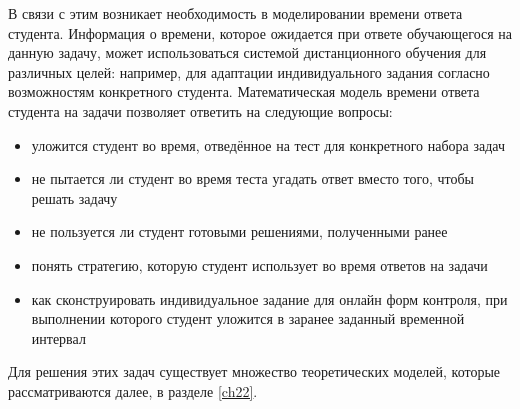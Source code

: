 В связи с этим возникает необходимость в моделировании времени отве\-та студента. Информация о времени, которое ожидается при ответе обучающего\-ся на данную задачу, может использоваться системой дистанционного обуче\-ния для различных целей: например, для адап\-тации индивидуального зада\-ния согласно возможностям конкретного студента. Математическая модель вре\-мени ответа студента на задачи позволяет ответить на следующие вопросы:
\begin{itemize}
\item уложится студент во время, отведённое на тест для конкретного набора задач
\item не пытается ли студент во время теста угадать ответ вместо того, чтобы решать задачу
\item не пользуется ли студент готовыми решениями, полученными ранее
\item понять стратегию, которую студент использует  во время ответов на задачи
\item как сконструировать индивидуальное задание для онлайн форм кон\-троля, при выполнении которого студент уложится в заранее заданный временной интервал
\end{itemize}

Для решения этих задач существует множество теоретических моделей, которые рассматриваются далее, в разделе \ref{ch22}.
